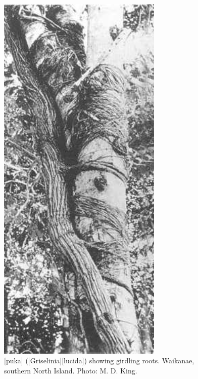 \begin{figure}[htb]
	\centering
	\begin{minipage}[t]{0.413\textwidth}
		\centering
		\includegraphics[width=0.7\textwidth]{graphics/figure48puka-roots.jpg}
    	\caption[Puka (\emph{Griselinia lucida}) showing girdling roots]{[puka] ([Griselinia][lucida]) showing girdling roots.
    	Waikanae, southern North Island.
    	Photo: M. D. King.}%
    	\label{fig:48puka-roots}
	\end{minipage}\hfill%
	\begin{minipage}[t]{0.567\textwidth}
    	\centering

\end{minipage}
\end{figure}
